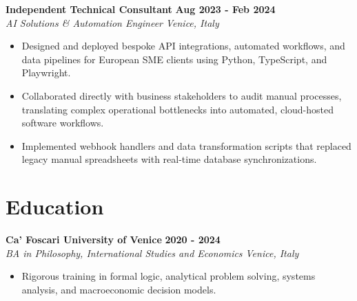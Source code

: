 \documentclass[10pt,a4paper]{article}
\newcommand{\role}[4]{%
  \textbf{#1} \hfill \textbf{#2}\\[1pt]%
  \textit{#3} \hfill \textit{#4}\\[2pt]%
}
\begin{document}
\role{Independent Technical Consultant}{Aug 2023 - Feb 2024}{AI Solutions \& Automation Engineer}{Venice, Italy}
\begin{itemize}
  \item Designed and deployed bespoke API integrations, automated workflows, and data pipelines for European SME clients using Python, TypeScript, and Playwright.
  \item Collaborated directly with business stakeholders to audit manual processes, translating complex operational bottlenecks into automated, cloud-hosted software workflows.
  \item Implemented webhook handlers and data transformation scripts that replaced legacy manual spreadsheets with real-time database synchronizations.
\end{itemize}

\section{Education}
\role{Ca' Foscari University of Venice}{2020 - 2024}{BA in Philosophy, International Studies and Economics}{Venice, Italy}
\begin{itemize}
  \item Rigorous training in formal logic, analytical problem solving, systems analysis, and macroeconomic decision models.
\end{itemize}
\end{document}
